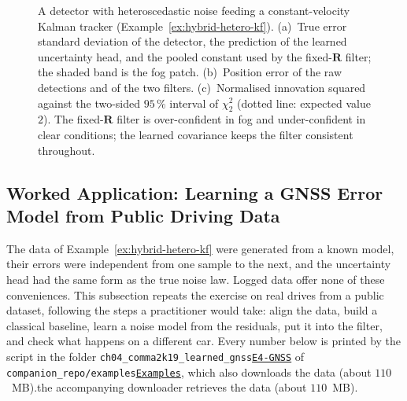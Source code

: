 \documentclass[graybox,envcountchap]{style/SNmono}
\newcommand{\repopath}[1]{\texttt{#1}}
\providecommand{\DIFadd}[1]{{\protect\color{blue} #1}} %
\providecommand{\DIFdel}[1]{{\protect\color{red} #1}} %
\DeclareRobustCommand{\RtwoDel}[1]{{\color{red}%
  \renewcommand{\DIFadd}[1]{##1}\renewcommand{\DIFdel}[1]{##1}%
  #1}}
\DeclareRobustCommand{\RtwoAdd}[1]{{\color{blue}#1}}
\DeclareRobustCommand{\codeentry}[1]{\hyperref[code:#1]{\texttt{#1}}}
\begin{document}
\begin{figure}[!t]
{
}
\caption{A detector with heteroscedastic noise feeding a constant-velocity Kalman tracker (Example~\ref{ex:hybrid-hetero-kf}). (a)~True error standard deviation of the detector, the prediction of the learned uncertainty head, and the pooled constant used by the fixed-$\mathbf{R}$ filter; the shaded band is the fog patch. (b)~Position error of the raw detections and of the two filters. (c)~Normalised innovation squared against the two-sided $95\,\%$ interval of $\chi^{2}_{2}$ (dotted line: expected value $2$). The fixed-$\mathbf{R}$ filter is over-confident in fog and under-confident in clear conditions; the learned covariance keeps the filter consistent throughout.}
\label{fig:hybrid-hetero-kf}
\end{figure}

\subsection{Worked Application: Learning a GNSS Error Model from Public Driving Data}
\label{subsec:c2k-application}
The data of Example~\ref{ex:hybrid-hetero-kf} were generated from a known model, their errors were independent from one sample to the next, and the uncertainty head had the same form as the true noise law. Logged data offer none of these conveniences. This subsection repeats the exercise on real drives from a public dataset, following the steps a practitioner would take: align the data, build a classical baseline, learn a noise model from the residuals, put it into the filter, and check what happens on a different car. Every number below is printed by the script in the folder \RtwoDel{\repopath{ch04\_\allowbreak comma2k19\_\allowbreak learned\_\allowbreak gnss}}\RtwoAdd{\codeentry{E4-GNSS}} of \RtwoDel{\repopath{companion\_\allowbreak repo/\allowbreak examples}}\RtwoAdd{\codeentry{Examples}}, \RtwoDel{which also downloads the data (about $110$~MB).}\RtwoAdd{the accompanying downloader retrieves the data (about $110$~MB).}
\end{document}
